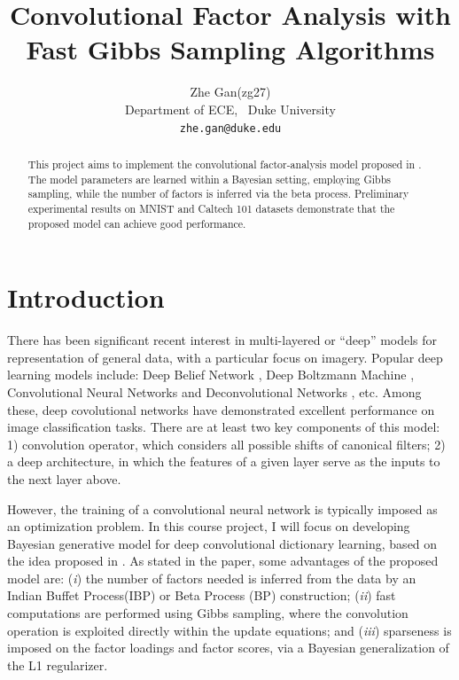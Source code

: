 \documentclass{article} %
\title{Convolutional Factor Analysis with Fast Gibbs Sampling Algorithms}
\author{
Zhe Gan(zg27) \\
Department of ECE, \ Duke University \\
\texttt{zhe.gan@duke.edu}
}
\begin{document}

\maketitle

\begin{abstract}
This project aims to implement the convolutional factor-analysis model proposed in \cite{chen2011hierarchical}. The model parameters are learned within a Bayesian setting, employing Gibbs sampling, while the number of factors is inferred via the beta process. Preliminary experimental results on MNIST and Caltech 101 datasets demonstrate that the proposed model can achieve good performance.  
\end{abstract}

\section{Introduction}
%
There has been significant recent interest in multi-layered or ``deep'' models for representation of general data, with a particular focus on imagery. Popular deep learning models include: Deep Belief Network \cite{hinton2006fast}, Deep Boltzmann Machine \cite{salakhutdinov2009deep}, Convolutional Neural Networks \cite{lecun1998gradient} and Deconvolutional Networks \cite{zeiler2010deconvolutional}, etc. Among these, deep covolutional networks have demonstrated excellent performance on image classification tasks. There are at least two key components of this model: 1) convolution operator, which considers all possible shifts of canonical filters; 2) a deep architecture, in which the features of a given layer serve as the inputs to the next layer above. 

However, the training of a convolutional neural network is typically imposed as an optimization problem. In this course project, I will focus on developing Bayesian generative model for deep convolutional dictionary learning, based on the idea proposed in \cite{chen2011hierarchical}. As stated in the paper, some advantages of the proposed model are: (\emph{i}) the number of factors needed is inferred from the data by an Indian Buffet Process(IBP) \cite{griffiths2011indian} or Beta Process (BP) \cite{paisley2009nonparametric} construction; (\emph{ii}) fast computations are performed using Gibbs sampling, where the convolution operation is exploited directly within the update
equations; and (\emph{iii}) sparseness is imposed on the factor loadings and factor scores, via a Bayesian generalization of the L1 regularizer. 
\end{document}
